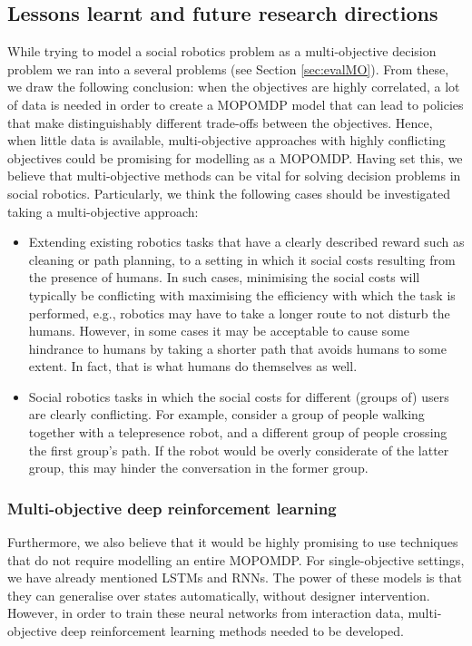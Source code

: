 \documentclass[a4paper,11pt]{report}
\begin{document}
\subsection{Lessons learnt and future research directions}
While trying to model a social robotics problem as a multi-objective decision problem we ran into a several problems (see Section \ref{sec:evalMO}). From these, we draw the following conclusion: when the objectives are highly correlated, a lot of data is needed in order to create a MOPOMDP model that can lead to policies that make distinguishably different trade-offs between the objectives. Hence, when little data is available, multi-objective approaches with highly conflicting objectives could be promising for modelling as a MOPOMDP.  Having set this, we believe that multi-objective methods can be vital for solving decision problems in social robotics. Particularly, we think the following cases should be investigated taking a multi-objective approach: 
\begin{itemize}
\item Extending existing robotics tasks that have a clearly described reward such as cleaning or path planning, to a setting in which it social costs resulting from the presence of humans. In such cases, minimising the social costs will typically be conflicting with maximising the efficiency with which the task is performed, e.g., robotics may have to take a longer route to not disturb the humans. However, in some cases it may be acceptable to cause some hindrance to humans by taking a shorter path that avoids humans to some extent. In fact, that is what humans do themselves as well. 
\item Social robotics tasks in which the social costs for different (groups of) users are clearly conflicting. For example, consider a group of people walking together with a telepresence robot, and a different group of people crossing the first group's path. If the robot would be overly considerate of the latter group, this may hinder the conversation in the former group. 
\end{itemize}

\subsubsection{Multi-objective deep reinforcement learning}
Furthermore, we also believe that it would be highly promising to use techniques that do not require modelling an entire MOPOMDP. For single-objective settings, we have already mentioned LSTMs and RNNs. The power of these models is that they can generalise over states automatically, without designer intervention. However, in order to train these neural networks from interaction data, multi-objective deep reinforcement learning methods needed to be developed. 
\end{document}
